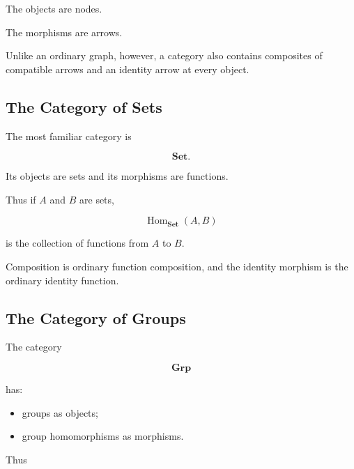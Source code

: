 \begin{center}
\end{center}

The objects are nodes.

The morphisms are arrows.

Unlike an ordinary graph, however, a category also contains composites of
compatible arrows and an identity arrow at every object.

\subsection{The Category of Sets}
\label{subsec:category-set}

The most familiar category is

\[ \mathbf{Set}. \]

Its objects are sets and its morphisms are functions.

Thus if \(A\) and \(B\) are sets,

\[ \operatorname{Hom}_{\mathbf{Set}}(A,B) \]

is the collection of functions from \(A\) to \(B\).

Composition is ordinary function composition, and the identity morphism is
the ordinary identity function.

\subsection{The Category of Groups}
\label{subsec:category-grp}

The category

\[ \mathbf{Grp} \]

has:

\begin{itemize}
    \item groups as objects;
    \item group homomorphisms as morphisms.
\end{itemize}

Thus

